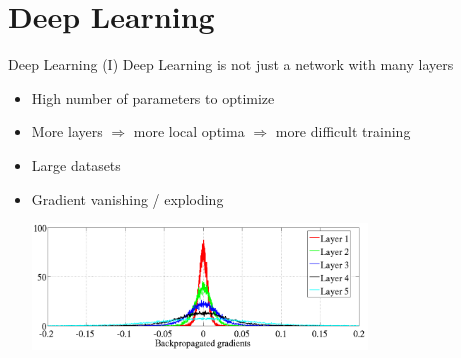 \documentclass[10pt,compress]{beamer} %
\begin{document}
\section{Deep Learning}

\begin{frame}{Deep Learning (I)}
    Deep Learning is not just a network with many layers
	\begin{itemize}
        \item High number of parameters to optimize
		\item More layers $\Rightarrow$ more local optima $\Rightarrow$ more difficult training
	\item Large datasets
	\item Gradient vanishing / exploding

	\medskip
	\centering
	\includegraphics[width=0.7\textwidth]{figs/gradients.png}\\
	\end{itemize}
\end{frame}
\end{document}
